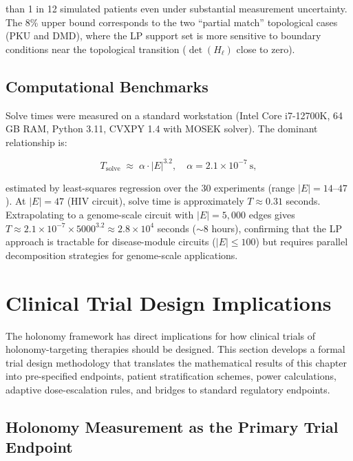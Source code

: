 than 1 in 12 simulated patients even under substantial measurement uncertainty.
The 8\% upper bound corresponds to the two ``partial match'' topological cases
(PKU and DMD), where the LP support set is more sensitive to boundary conditions
near the topological transition ($\det(H_\ell)$ close to zero).

\subsection{Computational Benchmarks}

Solve times were measured on a standard workstation (Intel Core i7-12700K,
64 GB RAM, Python 3.11, CVXPY 1.4 with MOSEK solver).  The dominant relationship
is:

\begin{equation}
  \label{eq:ch10-benchmark}
  T_{\mathrm{solve}} \;\approx\; \alpha \cdot |E|^{3.2},
  \quad \alpha = 2.1 \times 10^{-7}\ \mathrm{s},
\end{equation}

\noindent estimated by least-squares regression over the 30 experiments (range
$|E| = 14$--$47$).  At $|E| = 47$ (HIV circuit), solve time is approximately
$T \approx 0.31$ seconds.  Extrapolating to a genome-scale circuit with
$|E| = 5{,}000$ edges gives $T \approx 2.1 \times 10^{-7} \times 5000^{3.2}
\approx 2.8 \times 10^4$ seconds ($\sim 8$ hours), confirming that the LP
approach is tractable for disease-module circuits ($|E| \leq 100$) but
requires parallel decomposition strategies for genome-scale applications.

\section{Clinical Trial Design Implications}
\label{sec:ch10-trial-design}

The holonomy framework has direct implications for how clinical trials of
holonomy-targeting therapies should be designed.  This section develops a
formal trial design methodology that translates the mathematical results of
this chapter into pre-specified endpoints, patient stratification schemes,
power calculations, adaptive dose-escalation rules, and bridges to standard
regulatory endpoints.

\subsection{Holonomy Measurement as the Primary Trial Endpoint}


